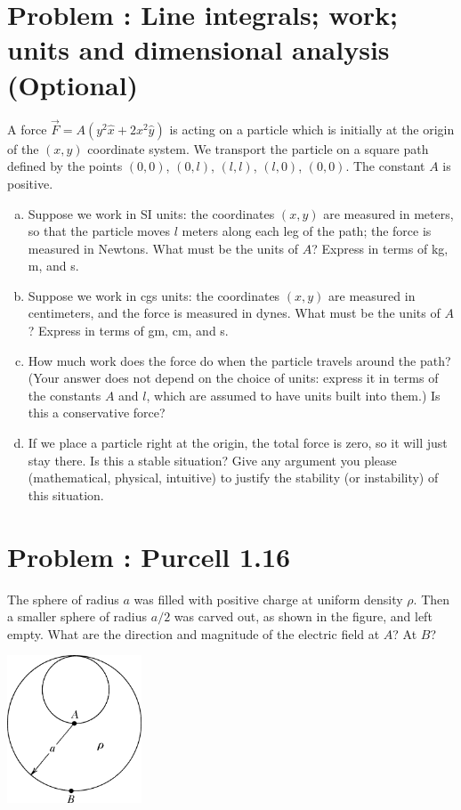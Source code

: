 \documentclass[problems]{esg8022pset}
\date{\today }
\begin{document}
  \addtocounter{section}{-1}
\section{Problem \thesection: Line integrals; work; units and dimensional analysis (Optional)}
  A force ${\vec F} = A(y^2{\hat x} + 2x^2{\hat y})$ is acting on a
  particle which is initially at the origin of the $(x,y)$ coordinate
  system.  We transport the particle on a square path defined by the
  points $(0,0)$, $(0,l)$, $(l,l)$, $(l,0)$, $(0,0)$.  The constant $A$
  is positive.

  \begin{enumerate}[(a)]
    \item Suppose we work in SI units: the coordinates $(x,y)$ are measured
      in meters, so that the particle moves $l$ meters along each leg of the
      path; the force is measured in Newtons.  What must be the units of
      $A$?  Express in terms of kg, m, and s.
    \item Suppose we work in cgs units: the coordinates $(x,y)$ are measured
      in centimeters, and the force is measured in dynes.  What must be the
      units of $A$?  Express in terms of gm, cm, and s.
    \item How much work does the force do when the particle travels around
      the path?  (Your answer does not depend on the choice of units:
      express it in terms of the constants $A$ and $l$, which are assumed to
      have units built into them.)  Is this a conservative force?
    \item If we place a particle right at the origin, the total force is
      zero, so it will just stay there.  Is this a stable situation?  Give
      any argument you please (mathematical, physical, intuitive) to justify
      the stability (or instability) of this situation.
  \end{enumerate}
\section{Problem \thesection: Purcell 1.16}
  The sphere of radius $a$ was filled with positive charge at uniform density $\rho$. Then a smaller sphere of radius $a/2$ was carved out, as shown in the figure, and left empty. What are the direction and magnitude of the electric field at $A$? At $B$?
  \begin{center}\includegraphics[width=0.3\textwidth]{ps02_1}\end{center}
\end{document}
